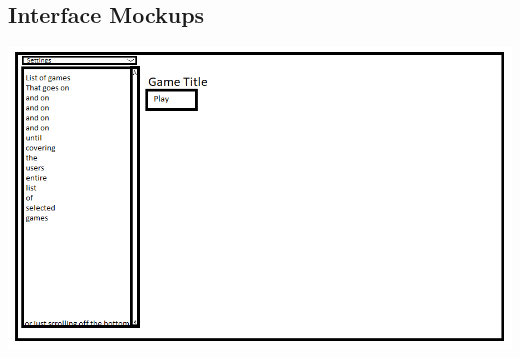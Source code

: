 \documentclass[10pt,conference,onecolumn,compsoc]{IEEEtran}
\begin{document}
\subsection{Interface Mockups}
\includegraphics[width=6in]{interfaceroughdraft.png}
%
%
%
%
%
%
\end{document}

